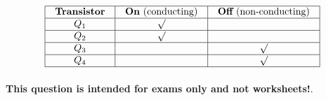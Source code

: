 $$\vbox{\offinterlineskip
\halign{\strut
\vrule \quad\hfil # \ \hfil & 
\vrule \quad\hfil # \ \hfil & 
\vrule \quad\hfil # \ \hfil \vrule \cr
\noalign{\hrule}
%
{\bf Transistor} & {\bf On} (conducting) & {\bf Off} (non-conducting) \cr
%
\noalign{\hrule}
%
$Q_1$ & $\surd$ &  \cr
%
\noalign{\hrule}
%
$Q_2$ & $\surd$ &  \cr
%
\noalign{\hrule}
%
$Q_3$ &  & $\surd$ \cr
%
\noalign{\hrule}
%
$Q_4$ &  & $\surd$ \cr
%
\noalign{\hrule}
} %
}$$ %







{\bf This question is intended for exams only and not worksheets!}.


